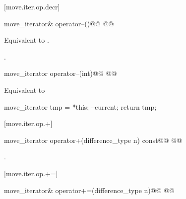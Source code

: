 [move.iter.op.decr]{}

%
%
\begin{itemdecl}
move_iterator& operator--()@\removed{;}@
  @@
\end{itemdecl}

\begin{itemdescr}
\pnum
\effects Equivalent to .

\pnum
\returns {}.
\end{itemdescr}

%
%
\begin{itemdecl}
move_iterator operator--(int)@\removed{;}@
  @@
\end{itemdecl}

\begin{itemdescr}
\pnum
\effects Equivalent to
\begin{codeblock}
move_iterator tmp = *this;
--current;
return tmp;
\end{codeblock}
\end{itemdescr}

[move.iter.op.+]{}

%
%
\begin{itemdecl}
move_iterator operator+(difference_type n) const@\removed{;}@
  @@
\end{itemdecl}

\begin{itemdescr}
\pnum
\removed{\returns}
.
\end{itemdescr}

[move.iter.op.+=]{}

%
%
\begin{itemdecl}
move_iterator& operator+=(difference_type n)@\removed{;}@
  @@
\end{itemdecl}

